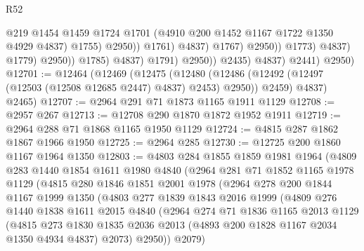 \begin{lexlean}{R52}
\begin{coremodule}
                                                @219
                                                @1454
                                                @1459
                                                @1724
                                                @1701
                                                (@4910 @200 @1452 @1167 @1722 @1350 @4929 @4837)
                                                @1755)
                                              @2950))
                                          @1761)
                                        @4837)
                                      @1767)
                                    @2950))
                                @1773)
                              @4837)
                            @1779)
                          @2950))
                      @1785)
                    @4837)
                  @1791)
                @2950))
            @2435)
          @4837)
        @2441)
      @2950)
@12701 := @12464
    (@12469
      (@12475
        (@12480 (@12486 (@12492 (@12497 (@12503 (@12508 @12685 @2447) @4837) @2453) @2950)) @2459)
        @4837)
      @2465)
@12707 := @2964 @291 @71 @1873 @1165 @1911 @1129
@12708 := @2957 @267
@12713 := @12708 @290 @1870 @1872 @1952 @1911
@12719 := @2964 @288 @71 @1868 @1165 @1950 @1129
@12724 := @4815 @287 @1862 @1867 @1966 @1950
@12725 := @2964 @285
@12730 := @12725 @200 @1860 @1167 @1964 @1350
@12803 := @4803
    @284
    @1855
    @1859
    @1981
    @1964
    (@4809
      @283
      @1440
      @1854
      @1611
      @1980
      @4840
      (@2964
        @281
        @71
        @1852
        @1165
        @1978
        @1129
        (@4815
          @280
          @1846
          @1851
          @2001
          @1978
          (@2964
            @278
            @200
            @1844
            @1167
            @1999
            @1350
            (@4803
              @277
              @1839
              @1843
              @2016
              @1999
              (@4809
                @276
                @1440
                @1838
                @1611
                @2015
                @4840
                (@2964
                  @274
                  @71
                  @1836
                  @1165
                  @2013
                  @1129
                  (@4815
                    @273
                    @1830
                    @1835
                    @2036
                    @2013
                    (@4893 @200 @1828 @1167 @2034 @1350 @4934 @4837)
                    @2073)
                  @2950))
              @2079)

\end{coremodule}
\end{lexlean}
